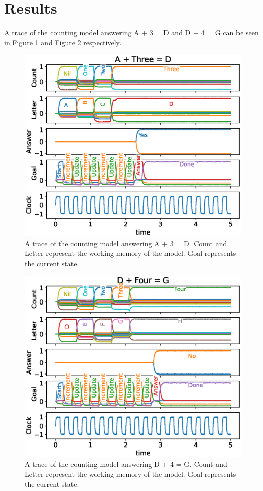 \documentclass[10pt, a4paper, twocolumn]{article}
\begin{document}
\section{Results}

A trace of the counting model answering A + 3 = D and D + 4 = G can be seen in Figure \ref{fig:counting-model-results-yes} and Figure \ref{fig:counting-model-results-no} respectively.
	
\begin{figure}[h]
	\centering
	\includegraphics[width=1.1\linewidth]{figures/counting-model-results-yes.eps}
	\caption{A trace of the counting model answering A + 3 = D. Count and Letter represent the working memory of the model. Goal represents the current state.}
	\label{fig:counting-model-results-yes}
\end{figure}

\begin{figure}[h]
	\centering
	\includegraphics[width=1.1\linewidth]{figures/counting-model-results-no.eps}
	\caption{A trace of the counting model answering D + 4 = G. Count and Letter represent the working memory of the model. Goal represents the current state.}
	\label{fig:counting-model-results-no}
\end{figure}
\end{document}
